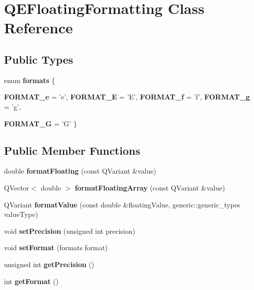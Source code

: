 \hypertarget{classQEFloatingFormatting}{
\section{QEFloatingFormatting Class Reference}
\label{classQEFloatingFormatting}
}
\subsection*{Public Types}
\begin{DoxyCompactItemize}
\item 
enum {\bfseries formats} \{ \par
{\bfseries FORMAT\_\-e} =  'e', 
{\bfseries FORMAT\_\-E} =  'E', 
{\bfseries FORMAT\_\-f} =  'f', 
{\bfseries FORMAT\_\-g} =  'g', 
\par
{\bfseries FORMAT\_\-G} =  'G'
 \}
\end{DoxyCompactItemize}
\subsection*{Public Member Functions}
\begin{DoxyCompactItemize}
\item 
\hypertarget{classQEFloatingFormatting_ae5c65a1041d64f28c480fadce7b6c75d}{
double {\bfseries formatFloating} (const QVariant \&value)}
\label{classQEFloatingFormatting_ae5c65a1041d64f28c480fadce7b6c75d}

\item 
\hypertarget{classQEFloatingFormatting_af98426073ca2774d43829e703cc38d2a}{
QVector$<$ double $>$ {\bfseries formatFloatingArray} (const QVariant \&value)}
\label{classQEFloatingFormatting_af98426073ca2774d43829e703cc38d2a}

\item 
\hypertarget{classQEFloatingFormatting_a69c20fd6e1fef5cb4669308ffc18c1f8}{
QVariant {\bfseries formatValue} (const double \&floatingValue, generic::generic\_\-types valueType)}
\label{classQEFloatingFormatting_a69c20fd6e1fef5cb4669308ffc18c1f8}

\item 
\hypertarget{classQEFloatingFormatting_abc6e31ec59b8235486f4972e5cf29920}{
void {\bfseries setPrecision} (unsigned int precision)}
\label{classQEFloatingFormatting_abc6e31ec59b8235486f4972e5cf29920}

\item 
\hypertarget{classQEFloatingFormatting_a62d52f930f99e9f11d55c17921d1ad57}{
void {\bfseries setFormat} (formats format)}
\label{classQEFloatingFormatting_a62d52f930f99e9f11d55c17921d1ad57}

\item 
\hypertarget{classQEFloatingFormatting_a13459b10a374cad75f0338abd951a840}{
unsigned int {\bfseries getPrecision} ()}
\label{classQEFloatingFormatting_a13459b10a374cad75f0338abd951a840}

\item 
\hypertarget{classQEFloatingFormatting_a8a83abb94093b4ca72cb7aa499cc67e7}{
int {\bfseries getFormat} ()}
\label{classQEFloatingFormatting_a8a83abb94093b4ca72cb7aa499cc67e7}

\end{DoxyCompactItemize}


